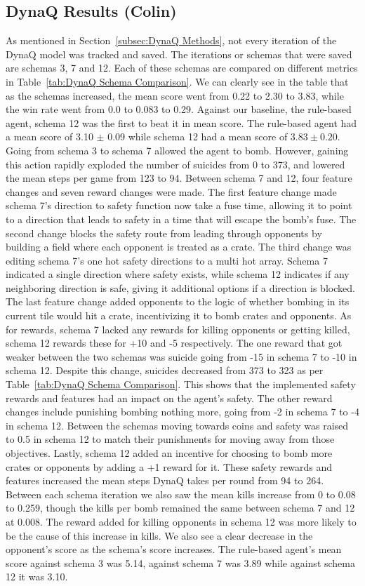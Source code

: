 \documentclass[article, 10pt]{IEEEtran}
\begin{document}
\subsection{DynaQ Results (Colin)}
As mentioned in Section~\ref{subsec:DynaQ Methods}, not every iteration of the DynaQ model was tracked and saved. The iterations or schemas that were saved are schemas 3, 7 and 12. Each of these schemas are compared on different metrics in Table~\ref{tab:DynaQ Schema Comparison}. We can clearly see in the table that as the schemas increased, the mean score went from 0.22 to 2.30 to 3.83, while the win rate went from 0.0 to 0.083 to 0.29. Against our baseline, the rule-based agent, schema 12 was the first to beat it in mean score. The rule-based agent had a mean score of 3.10 $\pm$ 0.09 while schema 12 had a mean score of $3.83 \pm 0.20$. Going from schema 3 to schema 7 allowed the agent to bomb. However, gaining this action rapidly exploded the number of suicides from 0 to 373, and lowered the mean steps per game from 123 to 94. Between schema 7 and 12, four feature changes and seven reward changes were made.  The first feature change made schema 7's direction to safety function now take a fuse time, allowing it to point to a direction that leads to safety in a time that will escape the bomb's fuse. The second change blocks the safety route from leading through opponents by building a field where each opponent is treated as a crate. The third change was editing schema 7's one hot safety directions to a multi hot array. Schema 7 indicated a single direction where safety exists, while schema 12 indicates if any neighboring direction is safe, giving it additional options if a direction is blocked. The last feature change added opponents to the logic of whether bombing in its current tile would hit a crate, incentivizing it to bomb crates and opponents. As for rewards, schema 7 lacked any rewards for killing opponents or getting killed, schema 12 rewards these for +10 and -5 respectively. The one reward that got weaker between the two schemas was suicide going from -15 in schema 7 to -10 in schema 12. Despite this change, suicides decreased from 373 to 323 as per Table~\ref{tab:DynaQ Schema Comparison}. This shows that the implemented safety rewards and features had an impact on the agent's safety. The other reward changes include punishing bombing nothing more, going from -2 in schema 7 to -4 in schema 12. Between the schemas moving towards coins and safety was raised to 0.5 in schema 12 to match their punishments for moving away from those objectives. Lastly, schema 12 added an incentive for choosing to bomb more crates or opponents by adding a +1 reward for it. These safety rewards and features increased the mean steps DynaQ takes per round from 94 to 264. Between each schema iteration we also saw the mean kills increase from 0 to 0.08 to 0.259, though the kills per bomb remained the same between schema 7 and 12 at 0.008. The reward added for killing opponents in schema 12 was more likely to be the cause of this increase in kills. We also see a clear decrease in the opponent's score as the schema's score increases. The rule-based agent's mean score against schema 3 was 5.14, against schema 7 was 3.89 while against schema 12 it was 3.10. 
\end{document}
